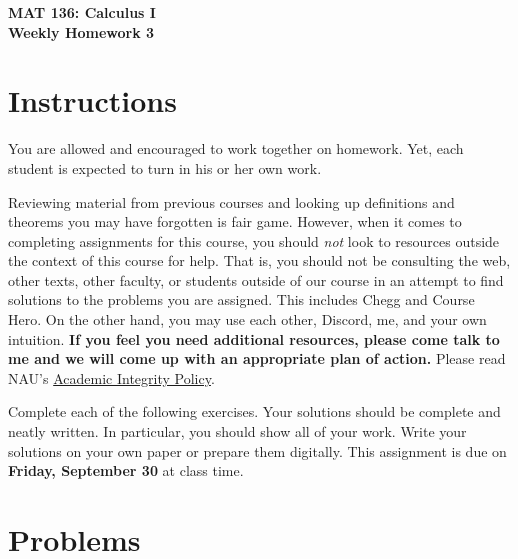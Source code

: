 \documentclass[11pt]{article}
\theoremstyle{definition}
\theoremstyle{definition}
\newcommand{\blankline}{\pagebreak[2]\vspace{.5\baselineskip}}
\begin{document}
\begin{center}

{\Large\bf MAT 136: Calculus I}\\
\smallskip
{\Large\bf Weekly Homework 3}

\bigskip


\end{center}

\setlength{\parindent}{0pt}
\setlength{\fboxsep}{10pt}

\section*{Instructions}
You are allowed and encouraged to work together on homework. Yet, each student is expected to turn in his or her own work.

\blankline

Reviewing material from previous courses and looking up definitions and theorems you may have forgotten is fair game. However, when it comes to completing assignments for this course, you should \emph{not} look to resources outside the context of this course for help.  That is, you should not be consulting the web, other texts, other faculty, or students outside of our course in an attempt to find solutions to the problems you are assigned.  This includes Chegg and Course Hero. On the other hand, you may use each other, Discord, me, and your own intuition. \textbf{If you feel you need additional resources, please come talk to me and we will come up with an appropriate plan of action.} Please read NAU's \href{https://www5.nau.edu/policies/Client/Details/828?whoIsLooking=Students&pertainsTo=All&sortDirection=Ascending&page=1}{Academic Integrity Policy}.

\blankline

Complete each of the following exercises.  Your solutions should be complete and neatly written.  In particular, you should show all of your work.  Write your solutions on your own paper or prepare them digitally. This assignment is due on \textbf{Friday, September 30} at class time.

\section*{Problems}
\end{document}
